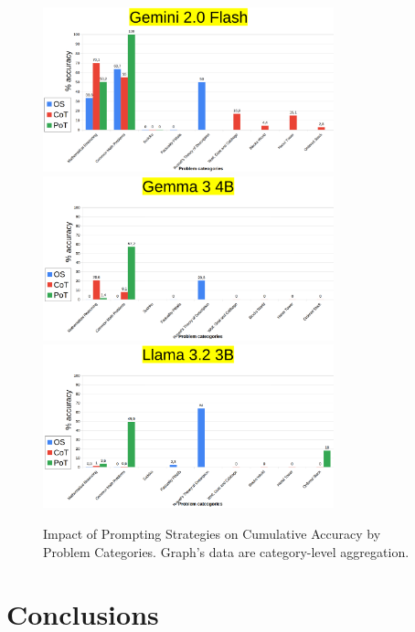 \documentclass[12pt]{article}
\begin{document}
\begin{figure}[H]
    \centering
            \includegraphics[width=0.75\textwidth]{MyGemini2Flash.png}
            \includegraphics[width=0.75\textwidth]{MyGemma3_8BBenchmarks.png}
            \includegraphics[width=0.75\textwidth]{MyLlama3_2_3B.png}
    \caption[My benchmark: accuracy by question category]{Impact of Prompting Strategies on Cumulative Accuracy by Problem Categories. Graph's data are category-level aggregation.}
    \label{fig:finalBench}
    \end{figure} 

\clearpage
\section{Conclusions}

\clearpage
\printbibliography
\clearpage
\end{document}
